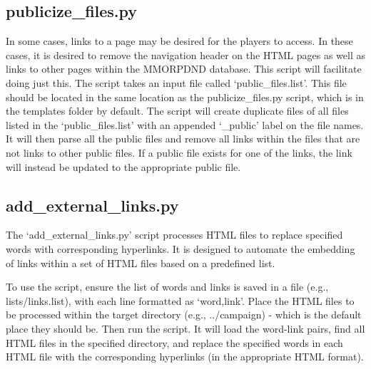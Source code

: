 \subsection{publicize\_files.py}

In some cases, links to a page may be desired for the players to access. In these cases, it is desired to remove the navigation header on the HTML pages as well as links to other pages within the MMORPDND database. This script will facilitate doing just this. The script takes an input file called `public\_files.list'. This file should be located in the same location as the publicize\_files.py script, which is in the templates folder by default. The script will create duplicate files of all files listed in the `public\_files.list' with an appended `\_public' label on the file names. It will then parse all the public files and remove all links within the files that are not links to other public files. If a public file exists for one of the links, the link will instead be updated to the appropriate public file.




\subsection{add\_external\_links.py}

The `add\_external\_links.py' script processes HTML files to replace specified words with corresponding hyperlinks. It is designed to automate the embedding of links within a set of HTML files based on a predefined list. 

To use the script, ensure the list of words and links is saved in a file (e.g., lists/links.list), with each line formatted as `word,link'. Place the HTML files to be processed within the target directory (e.g., ../campaign) - which is the default place they should be. Then run the script. It will load the word-link pairs, find all HTML files in the specified directory, and replace the specified words in each HTML file with the corresponding hyperlinks (in the appropriate HTML format).


